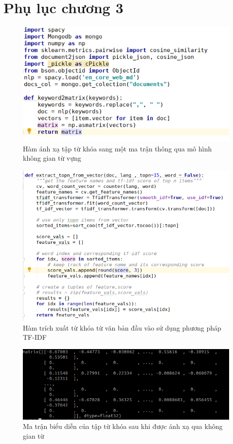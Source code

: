 \documentclass[12pt]{report}
\begin{document}
\section{Phụ lục chương 3}
\begin{figure}[h]
	\centering
	\includegraphics[scale=0.7]{word_embedding}
	\caption{Hàm ánh xạ tập từ khóa sang một ma trận thông qua mô hình không gian từ vựng}
\end{figure}

\begin{figure}[h]
	\centering
	\includegraphics[scale=0.7]{extract_keyword}
	\caption{Hàm trích xuất từ khóa từ văn bản đầu vào sử dụng phương pháp TF-IDF}
\end{figure}

\begin{figure}[h]
	\centering
	\includegraphics[scale=0.7]{matrix_vector}
	\caption{Ma trận biểu diễn của tập từ khóa sau khi được ánh xạ qua không gian từ}
\end{figure}
\end{document}
